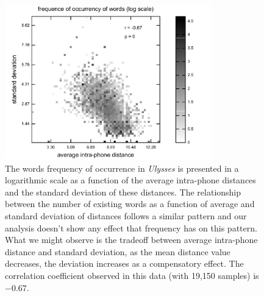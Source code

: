 \begin{figure}[h]
\centering  
\includegraphics[width=0.8\textwidth]{images/ulysses_words_intra_phone_distance_freq_occ_avg_std.pdf}  
\caption{The words frequency of occurrence  in \textit{Ulysses} is presented in a logarithmic scale as a function
of the average intra-phone distances and the standard deviation of these distances. The relationship
between the number of existing words as a function of average and standard deviation of distances follows
a similar pattern and our analysis doesn't show any effect that frequency has on this pattern. 
What we might observe is the tradeoff between average intra-phone distance and standard deviation, 
as the mean distance value decreases, the deviation increases as a compensatory effect. 
The correlation coefficient observed in this data (with 19,150 samples) is $-0.67$.}
\label{fig:ulysses_words_intra_phone_distance_freq_occ_avg_std}  
\end{figure} 


